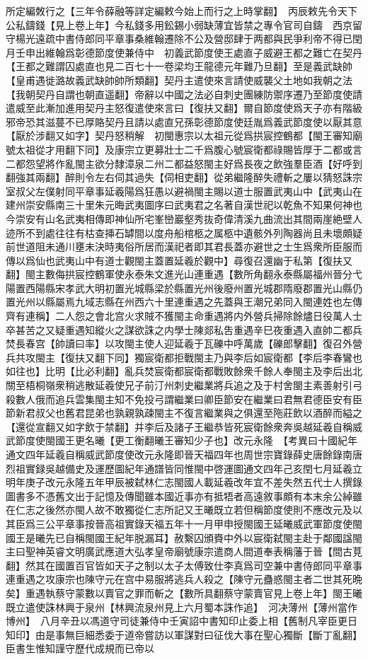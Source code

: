 所定編敇行之【三年令薛融等詳定編敕今始上而行之上時掌翻】　丙辰敕先令天下公私鑄錢【見上卷上年】今私錢多用鈆錫小弱缺薄宜皆禁之專令官司自鑄　西京留守楊光遠疏中書侍郎同平章事桑維翰遷除不公及營邸肆于两都與民爭利帝不得已閏月壬申出維翰爲彰德節度使兼侍中　初義武節度使王處直子威避王都之難亡在契丹【王都之難謂囚處直也見二百七十一卷梁均王龍德元年難乃旦翻】至是義武缺帥【皇甫遇徙潞故義武缺帥帥所類翻】契丹主遣使來言請使威襲父土地如我朝之法【我朝契丹自謂也朝直遥翻】帝辭以中國之法必自刺史團練防禦序遷乃至節度使請遣威至此漸加進用契丹主怒復遣使來言曰【復扶又翻】爾自節度使爲天子亦有階級邪帝恐其滋蔓不已厚賂契丹且請以處直兄孫彰德節度使廷胤爲義武節度使以厭其意【厭於涉翻又如字】契丹怒稍解　初閩惠宗以太祖元從爲拱宸控鶴都【閩王審知廟號太祖從才用翻下同】及康宗立更募壯士二千爲腹心號宸衛都祿賜皆厚于二都或言二都怨望將作亂閩主欲分隸漳泉二州二都益怒閩主好爲長夜之飲強羣臣酒【好呼到翻強其兩翻】醉則令左右伺其過失【伺相吏翻】從弟繼隆醉失禮斬之屢以猜怒誅宗室叔父左僕射同平章事延羲陽爲狂愚以避禍閩主賜以道士服置武夷山中【武夷山在建州崇安縣南三十里朱元晦武夷圖序曰武夷君之名著自漢世祀以乾魚不知果何神也今崇安有山名武夷相傳即神仙所宅峯巒巖壑秀抜奇偉清溪九曲流出其間兩崖絶壁人迹所不到處往往有枯查挿石罅間以度舟船棺柩之属柩中遺骸外列陶器尚且未壞頗疑前世道阻未通川壅未決時夷俗所居而漢祀者即其君長蓋亦避世之士生爲衆所臣服而傳以爲仙也武夷山中有道士觀閩主蓋置延羲於觀中】尋復召還幽于私第【復扶又翻】閩主數侮拱宸控鶴軍使永泰朱文進光山連重遇【數所角翻永泰縣屬福州晉分弋陽置西陽縣宋孝武大明初置光城縣梁於縣置光州後廢州置光城郡隋廢郡置光山縣仍置光州以縣屬焉九域志縣在州西六十里連重遇之先蓋與王潮兄弟同入閩連姓也左傳齊有連稱】二人怨之會北宫火求賊不獲閩主命重遇將内外營兵掃除餘燼日役萬人士卒甚苦之又疑重遇知縱火之謀欲誅之内學士陳郯私吿重遇辛巳夜重遇入直帥二都兵焚長春宫【帥讀曰率】以攻閩主使人迎延羲于瓦礫中呼萬歲【礫郎擊翻】復召外營兵共攻閩主【復扶又翻下同】獨宸衛都拒戰閩主乃與李后如宸衛都【李后李春鸞也如往也】比明【比必利翻】亂兵焚宸衛都宸衛都戰敗餘衆千餘人奉閩主及李后出北關至梧桐嶺衆稍逃散延羲使兄子前汀州刺史繼業將兵追之及于村舍閩主素善射引弓殺數人俄而追兵雲集閩主知不免投弓謂繼業曰卿臣節安在繼業曰君無君德臣安有臣節新君叔父也舊君昆弟也孰親孰疎閩主不復言繼業與之俱還至陁莊飲以酒醉而縊之【還從宣翻又如字飲于禁翻】并李后及諸子王繼恭皆死宸衛餘衆奔吳越延羲自稱威武節度使閩國王更名曦【更工衡翻曦王審知少子也】改元永隆　【考異曰十國紀年通文四年延羲自稱威武節度使改元永隆即晉天福四年也周世宗寶錄薛史唐餘錄南唐烈祖實録吳越備史及運歷圖紀年通譜皆同惟閩中啓運圖通文四年己亥閏七月延羲立明年庚子改元永隆五年甲辰被弑林仁志閩國人載延羲改年宜不差失然五代士人撰錄圖書多不憑舊文出于記憶及傳聞雖本國近事亦有抵牾者高遠敘事頗有本末余公綽雖在仁志之後然亦閩人故不敢獨從仁志所記又王曦既立若但稱節度使則不應改元及以其臣爲三公平章事按晉高祖實錄天福五年十一月甲申授閩國王延曦威武軍節度使閩國王是曦先已自稱閩國王紀年脱漏耳】赦繫囚頒賚中外以宸衛弑閩主赴于鄰國諡閩主曰聖神英睿文明廣武應道大弘孝皇帝廟號康宗遣商人間道奉表稱藩于晉【間古莧翻】然其在國置百官皆如天子之制以太子太傅致仕李真爲司空兼中書侍郎同平章事連重遇之攻康宗也陳守元在宫中易服將逃兵人殺之【陳守元蠱惑閩主者二世其死晩矣】重遇執蔡守蒙數以賣官之罪而斬之【數所具翻蔡守蒙賣官見上卷上年】閩王曦既立遣使誅林興于泉州【林興流泉州見上六月蜀本誅作追】　河决薄州【薄州當作博州】　八月辛丑以馮道守司徒兼侍中壬寅詔中書知印止委上相【舊制凡宰臣更日知印】由是事無巨細悉委于道帝嘗訪以軍謀對曰征伐大事在聖心獨斷【斷丁亂翻】臣書生惟知謹守歷代成規而已帝以